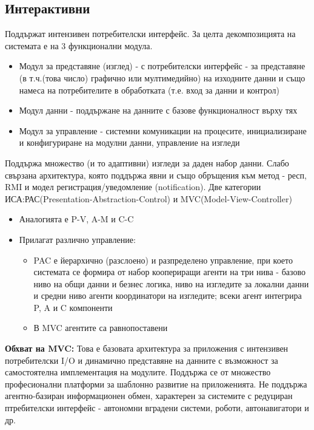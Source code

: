 \documentclass[11pt]{article} %
\begin{document}
\subsection{Интерактивни}
Поддържат интензивен потребителски интерфейс. За целта декомпозицията на системата е на 3 функционални модула.
\begin{itemize}[noitemsep]
	\item Модул за представяне (изглед) - с потребителски интерфейс - за представяне (в т.ч.(това число) графично или мултимедийно) на изходните данни и също намеса на потребителите в обработката (т.е. вход за данни и контрол)
	\item Модул данни - поддържане на данните с базове функционалност върху тях
	\item Модул за управление - системни комуникации на процесите, инициализиране и конфигуриране на модулни данни, управление на изгледи
\end{itemize}
Поддържа множество (и то адаптивни) изгледи за даден набор данни. Слабо свързана архитектура, която поддържа явни и също обръщения към метод - респ, RMI и модел регистрация/уведомление (notification). Две категории ИСА:РАС(Presentation-Abstraction-Control) и MVC(Model-View-Controller)
\begin{itemize}[noitemsep]
	\item Аналогията е P-V, A-M и C-C
	\item Прилагат различно управление:
	\begin{itemize}[noitemsep]
		\item PAC е йерархично (разслоено) и разпределено управление, при което системата се формира от набор коопериращи агенти на три нива - базово ниво на общи данни и безнес логика, ниво на изгледите за локални данни и средни ниво агенти координатори на изгледите; всеки агент интегрира P, A и C компоненти
		\item В MVC агентите са равнопоставени
	\end{itemize}
\end{itemize}

\textbf{Обхват на MVC:} Това е базовата архитектура за приложения с интензивен потребителски I/O и динамично представяне на данните с възможност за самостоятелна имплементация на модулите. Поддържа се от множество професионални платформи за шаблонно развитие на приложенията. Не поддържа агентно-базиран информационен обмен, характерен за системите с редуциран птребителски интерфейс - автономни вградени системи, роботи, автонавигатори и др.\\\par
\end{document}
